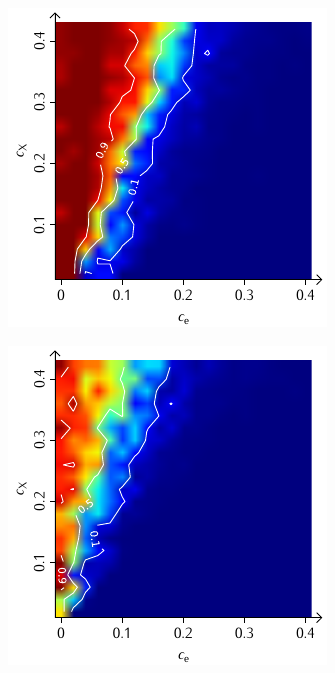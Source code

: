 \documentclass[a4paper, 10pt, twoside, openany]{book} %
\begin{document}
	\begin{figure}
		\begin{minipage}[t]{0.48\textwidth}
			\includegraphics[width=\textwidth]{Abbildungen/Phasendiagramme/Konturen/F_cluster_G.pdf}
			\label{F_cluster_G}
		\end{minipage}
		\hfill
		\begin{minipage}[t]{0.48\textwidth}
			\includegraphics[width=\textwidth]{Abbildungen/Phasendiagramme/Konturen/F_penalty_cluster_G.pdf}

\end{minipage}
\end{figure}
\end{document}
